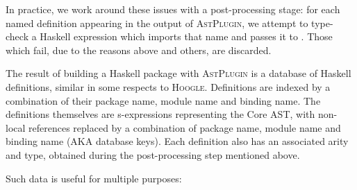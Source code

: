 In practice, we work around these issues with a post-processing stage: for each named definition appearing in the output of \textsc{AstPlugin}, we attempt to type-check a Haskell expression which imports that name and passes it to \qspec{}. Those which fail, due to the reasons above and others, are discarded.

The result of building a Haskell package with \textsc{AstPlugin} is a database of Haskell definitions, similar in some respects to \textsc{Hoogle}. Definitions are indexed by a combination of their package name, module name and binding name. The definitions themselves are s-expressions representing the Core AST, with non-local references replaced by a combination of package name, module name and binding name (AKA database keys). Each definition also has an associated arity and type, obtained during the post-processing step mentioned above.

Such data is useful for multiple purposes:

